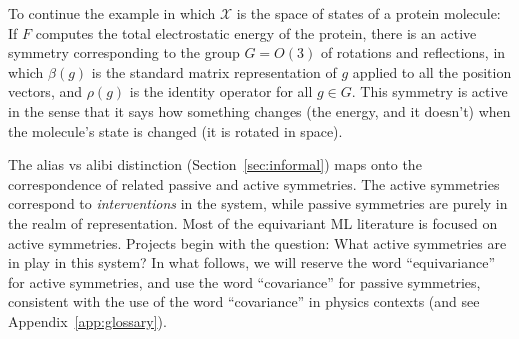 \documentclass[]{article} %
\renewcommand{\mathcal}[1]{\mathscr{#1}} %
\newcommand{\sectionname}{Section}
\newcommand{\secref}[1]{\sectionname~\ref{#1}}
\newcommand{\appref}[1]{Appendix~\ref{#1}}
\begin{document}
To continue the example in which $\mathcal{X}$ is the space of states of a protein molecule:
If $F$ computes the total electrostatic energy of the protein, there is an active symmetry corresponding to the group $G=O(3)$ of rotations and reflections, in which $\beta(g)$ is the standard matrix representation of $g$ applied to all the position vectors, and $\rho(g)$ is the identity operator for all $g\in G$.
This symmetry is active in the sense that it says how something changes (the energy, and it doesn't) when the molecule's state is changed (it is rotated in space).

The alias vs alibi distinction (\secref{sec:informal}) maps onto the correspondence of related passive and active symmetries.
The active symmetries correspond to \emph{interventions} in the system, while passive symmetries are purely in the realm of representation.
Most of the equivariant ML literature is focused on active symmetries.
Projects begin with the question: What active symmetries are in play in this system?
In what follows, we will reserve the word ``equivariance'' for active symmetries, and use the word ``covariance'' for passive symmetries, consistent with the use of the word ``covariance'' in physics contexts (and see \appref{app:glossary}).

\end{document}
